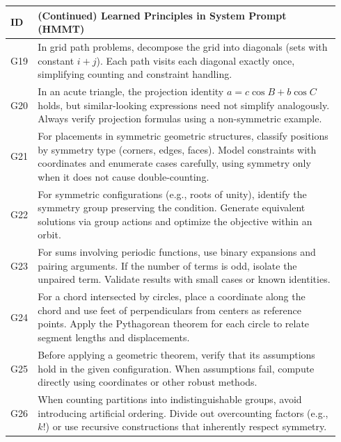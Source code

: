 \documentclass{article}
\theoremstyle{plain}
\theoremstyle{definition}
\theoremstyle{remark}
\begin{document}
\begin{table}[t]
\centering
\small
\setlength{\tabcolsep}{6pt}
\renewcommand{\arraystretch}{1.4}
\begin{tabular}{p{0.04\linewidth} p{0.9\linewidth}}
\toprule
\textbf{ID} & \textbf{(Continued) Learned Principles in System Prompt (HMMT)} \\
\midrule
G19 & In grid path problems, decompose the grid into diagonals (sets with constant \(i+j\)). Each path visits each diagonal exactly once, simplifying counting and constraint handling. \\

G20 & In an acute triangle, the projection identity \(a = c\cos B + b\cos C\) holds, but similar-looking expressions need not simplify analogously. Always verify projection formulas using a non-symmetric example. \\

G21 & For placements in symmetric geometric structures, classify positions by symmetry type (corners, edges, faces). Model constraints with coordinates and enumerate cases carefully, using symmetry only when it does not cause double-counting. \\

G22 & For symmetric configurations (e.g., roots of unity), identify the symmetry group preserving the condition. Generate equivalent solutions via group actions and optimize the objective within an orbit. \\

G23 & For sums involving periodic functions, use binary expansions and pairing arguments. If the number of terms is odd, isolate the unpaired term. Validate results with small cases or known identities. \\

G24 & For a chord intersected by circles, place a coordinate along the chord and use feet of perpendiculars from centers as reference points. Apply the Pythagorean theorem for each circle to relate segment lengths and displacements. \\

G25 & Before applying a geometric theorem, verify that its assumptions hold in the given configuration. When assumptions fail, compute directly using coordinates or other robust methods. \\

G26 & When counting partitions into indistinguishable groups, avoid introducing artificial ordering. Divide out overcounting factors (e.g., \(k!\)) or use recursive constructions that inherently respect symmetry. \\


\end{tabular}
\end{table}
\end{document}
